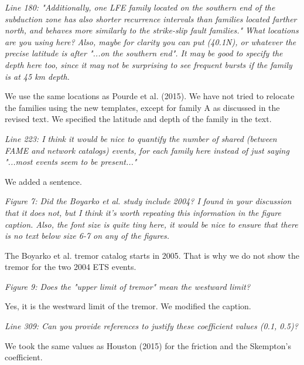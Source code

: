 \documentclass[letterpaper, 12pt]{article}
\begin{document}
\textit{Line 180: "Additionally, one LFE family located on the southern end of the subduction zone has also shorter recurrence intervals than families located farther north, and behaves more similarly to the strike-slip fault families." What locations are you using here? Also, maybe for clarity you can put (40.1N), or whatever the precise latitude is after "...on the southern end". It may be good to specify the depth here too, since it may not be surprising to see frequent bursts if the family is at 45 km depth.}

\bigskip

We use the same locations as Pourde et al. (2015). We have not tried to relocate the families using the new templates, except for family A as discussed in the revised text. We specified the latitude and depth of the family in the text.

\bigskip

\textit{Line 223: I think it would be nice to quantify the number of shared (between FAME and network catalogs) events, for each family here instead of just saying "...most events seem to be present..."}

\bigskip

We added a sentence.

\bigskip

\textit{Figure 7: Did the Boyarko et al. study include 2004? I found in your discussion that it does not, but I think it's worth repeating this information in the figure caption. Also, the font size is quite tiny here, it would be nice to ensure that there is no text below size 6-7 on any of the figures.}

\bigskip

The Boyarko et al. tremor catalog starts in 2005. That is why we do not show the tremor for the two 2004 ETS events.

\bigskip

\textit{Figure 9: Does the "upper limit of tremor" mean the westward limit?}

\bigskip

Yes, it is the westward limit of the tremor. We modified the caption.

\bigskip

\textit{Line 309: Can you provide references to justify these coefficient values (0.1, 0.5)?}

\bigskip

We took the same values as Houston (2015) for the friction and the Skempton's coefficient.

\bigskip
\end{document}
